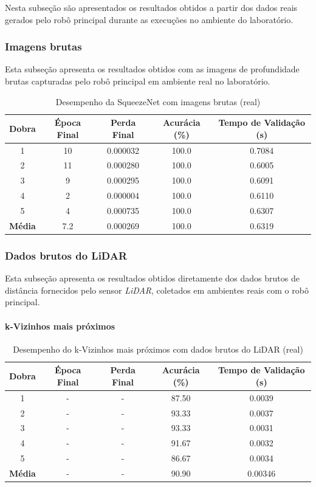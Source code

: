 Nesta subseção são apresentados os resultados obtidos a partir dos dados reais gerados pelo robô principal durante as execuções no ambiente do laboratório.

\subsubsection{Imagens brutas}

Esta subseção apresenta os resultados obtidos com as imagens de profundidade brutas capturadas pelo robô principal em ambiente real no laboratório.

\begin{table}[H]
\centering
\caption{Desempenho da SqueezeNet com imagens brutas (real)}
\label{tab:squeezenet_lidar_real}
\begin{tabular}{ccccc}
\hline
\textbf{Dobra} & \textbf{Época Final} & \textbf{Perda Final} & \textbf{Acurácia (\%)} & \textbf{Tempo de Validação (s)} \\
\hline
1 & 10 & 0.000032 & 100.0 & 0.7084 \\
2 & 11 & 0.000280 & 100.0 & 0.6005 \\
3 & 9  & 0.000295 & 100.0 & 0.6091 \\
4 & 2  & 0.000004 & 100.0 & 0.6110 \\
5 & 4  & 0.000735 & 100.0 & 0.6307 \\
\hline
\textbf{Média} & 7.2 & 0.000269 & 100.0 & 0.6319 \\
\hline
\end{tabular}
\fonte{}
\end{table}

\subsubsection{Dados brutos do LiDAR}

Esta subseção apresenta os resultados obtidos diretamente dos dados brutos de distância fornecidos pelo sensor \textit{LiDAR}, coletados em ambientes reais com o robô principal. 

\paragraph{k-Vizinhos mais próximos}

\begin{table}[H]
\centering
\caption{Desempenho do k-Vizinhos mais próximos com dados brutos do LiDAR (real)}
\label{tab:knn_lidar_bruto_real_2}
\begin{tabular}{ccccc}
\hline
\textbf{Dobra} & \textbf{Época Final} & \textbf{Perda Final} & \textbf{Acurácia (\%)} & \textbf{Tempo de Validação (s)} \\
\hline
1 & - & - & 87.50 & 0.0039 \\
2 & - & - & 93.33 & 0.0037 \\
3 & - & - & 93.33 & 0.0031 \\
4 & - & - & 91.67 & 0.0032 \\
5 & - & - & 86.67 & 0.0034 \\
\hline
\textbf{Média} & - & - & 90.90 & 0.00346 \\
\hline
\end{tabular}
\fonte{}
\end{table}

